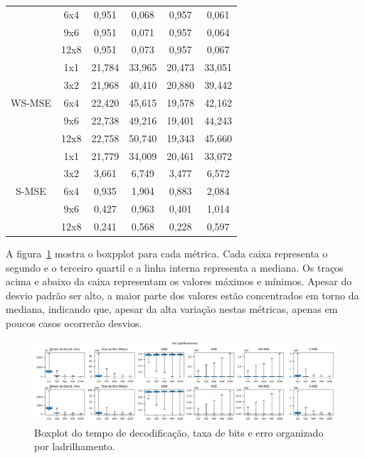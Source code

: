 {\begin{longtable}{|c|c|c|c|c|c|}
        & 6x4  & 0,951     & 0,068      & 0,957     & 0,061    \\  \cline{2-6}
        & 9x6  & 0,951     & 0,071      & 0,957     & 0,064    \\  \cline{2-6}
        & 12x8 & 0,951     & 0,073      & 0,957     & 0,067    \\  \hline 
        \multirow{5}{*}{WS-MSE}& 1x1  & 21,784    & 33,965     & 20,473    & 33,051   \\  \cline{2-6}
        & 3x2  & 21,968    & 40,410     & 20,880    & 39,442   \\  \cline{2-6}
        & 6x4  & 22,420    & 45,615     & 19,578    & 42,162   \\  \cline{2-6}           
        & 9x6  & 22,738    & 49,216     & 19,401    & 44,243   \\  \cline{2-6}                
        & 12x8 & 22,758    & 50,740     & 19,343    & 45,660   \\  \hline 
        \multirow{5}{*}{S-MSE}  & 1x1  & 21,779    & 34,009     & 20,461    & 33,072   \\  \cline{2-6}
        & 3x2  & 3,661     & 6,749      & 3,477     & 6,572    \\  \cline{2-6}
        & 6x4  & 0,935     & 1,904      & 0,883     & 2,084    \\  \cline{2-6}
        & 9x6  & 0,427     & 0,963      & 0,401     & 1,014    \\  \cline{2-6}
        & 12x8 & 0,241     & 0,568      & 0,228     & 0,597 
\end{longtable}

A figura~\ref{Fig:boxplottiling} mostra o boxpplot para cada métrica. Cada caixa representa o segundo e o terceiro quartil e a linha interna representa a mediana. Os traços acima e abaixo da caixa representam os valores máximos e mínimos. Apesar do desvio padrão ser alto, a maior parte dos valores estão concentrados em torno da mediana, indicando que, apesar da alta variação nestas métricas, apenas em poucos casos ocorrerão desvios.

\begin{figure}[htb]
         \centering         

           \includegraphics[width=0.9\columnwidth]{fig/ByPattern/boxplot_pattern.pdf}
           \caption{Boxplot do tempo de decodificação, taxa de bits e erro organizado por ladrilhamento.}
           \label{Fig:boxplottiling}
\end{figure}


}
